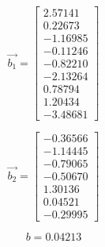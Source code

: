 \documentclass[preprint,12pt,times]{elsarticle}
\begin{document}
\begin{equation*}
\overrightarrow{b_1}=\left[
\begin{array}{r}
  2.57141\\
  0.22673\\
 -1.16985\\
 -0.11246\\
 -0.82210\\
 -2.13264\\
  0.78794\\
  1.20434\\
 -3.48681
\end{array}\right]
\end{equation*}

\begin{equation*}
\overrightarrow{b_2}=\left[
\begin{array}{r}
 -0.36566\\
 -1.14445\\
 -0.79065\\
 -0.50670\\
  1.30136\\
  0.04521\\
 -0.29995
\end{array}\right]
\end{equation*}

\begin{equation*}
b=0.04213
\end{equation*}

%
\end{document}
